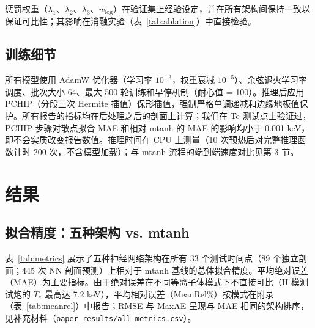\documentclass[a4paper,12pt]{ctexart}
\begin{document}
惩罚权重（$\lambda_1$、$\lambda_2$、$\lambda_3$、$w_{\log}$）在验证集上经验设定，并在所有架构间保持一致以保证可比性；其影响在消融实验（表~\ref{tab:ablation}）中直接检验。

\subsection{训练细节}

所有模型使用 AdamW 优化器（学习率 $10^{-3}$，权重衰减 $10^{-5}$）、余弦退火学习率调度、批次大小 64、最大 500 轮训练和早停机制（耐心值 = 100）。推理后应用 PCHIP（分段三次 Hermite 插值）保形插值，强制严格单调递减和边缘地板值保护。所有报告的指标均在后处理之后的剖面上计算；我们在 Te 测试点上验证过，PCHIP 步骤对散点拟合 MAE 和相对 mtanh 的 MAE 的影响均小于 0.001 keV，即不会实质改变报告数值。推理时间在 CPU 上测量（10 次预热后对完整推理函数计时 200 次，不含模型加载）；与 mtanh 流程的端到端速度对比见第 3 节。

\section{结果}

\subsection{拟合精度：五种架构 vs. mtanh}

表~\ref{tab:metrics} 展示了五种神经网络架构在所有 33 个测试时间点（89 个独立剖面；445 次 NN 剖面预测）上相对于 mtanh 基线的总体拟合精度。平均绝对误差（MAE）为主要指标。由于绝对误差在不同等离子体模式下不直接可比（H 模测试炮的 $T_e$ 最高达 7.2 keV），平均相对误差（MeanRel\%）按模式在附录（表~\ref{tab:meanrel}）中报告；RMSE 与 MaxAE 呈现与 MAE 相同的架构排序，见补充材料（\texttt{paper\_results/all\_metrics.csv}）。
\end{document}
